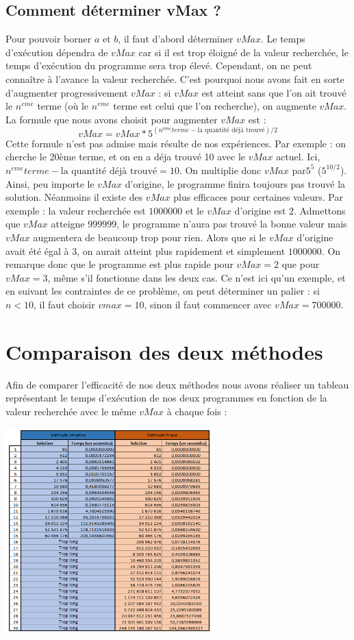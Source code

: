 \documentclass{article}
\begin{document}
\subsection{Comment déterminer vMax ?}

Pour pouvoir borner $a$ et $b$, il faut d'abord déterminer $vMax$. Le temps d'exécution dépendra de $vMax$ car si il est trop éloigné de la valeur recherchée, le temps d'exécution du programme sera trop élevé. Cependant, on ne peut connaître à l'avance la valeur recherchée. C'est pourquoi nous avons fait en sorte d'augmenter progressivement $vMax$ : si $vMax$ est atteint sans que l'on ait trouvé le $n^{eme}$ terme (où le $n^{eme}$ terme est celui que l'on recherche), on augmente $vMax$. La formule que nous avons choisit pour augmenter $vMax$ est : \[vMax = vMax * 5^{(n^{ème} terme - \text{la quantité déjà trouvé})/2}\] Cette formule n'est pas admise mais résulte de nos expériences. Par exemple : on cherche le 20ème terme, et on en a déja trouvé 10 avec le $vMax$ actuel. Ici, $n^{eme} terme - \text{la quantité déjà trouvé} = 10$. On multiplie donc $vMax$ par$5^{5}$ ($5^{10/2}$). Ainsi, peu importe le $vMax$ d'origine, le programme finira toujours pas trouvé la solution. Néanmoins il existe des $vMax$ plus efficaces pour certaines valeurs. Par exemple : la valeur recherchée est $1 000 000$ et le $vMax$ d'origine est $2$. Admettons que $vMax$ atteigne $999 999$, le programme n'aura pas trouvé la bonne valeur mais $vMax$ augmentera de beaucoup trop pour rien. Alors que si le $vMax$ d'origine avait été égal à $3$, on aurait atteint plus rapidement et simplement $1 000 000$. On remarque donc que le programme est plus rapide pour $vMax = 2$ que pour $vMax = 3$, même s'il fonctionne dans les deux cas. Ce n'est ici qu'un exemple, et en suivant les contraintes de ce problème, on peut déterminer un palier : si $n < 10$, il faut choisir $vmax = 10$, sinon il faut commencer avec $vMax = 700 000$.

\section{Comparaison des deux méthodes}
Afin de comparer l'efficacité de nos deux méthodes nous avons réaliser un tableau représentant le temps d'exécution de nos deux programmes en fonction de la valeur recherchée avec le même $vMax$ à chaque fois :

\bigbreak
\includegraphics[width = 8cm]{Tableau.png}
\bigbreak
\end{document}
